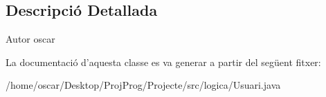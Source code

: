 \subsection{Descripció Detallada}
\begin{DoxyAuthor}{Autor}
oscar 
\end{DoxyAuthor}


La documentació d'aquesta classe es va generar a partir del següent fitxer\+:\begin{DoxyCompactItemize}
\item 
/home/oscar/\+Desktop/\+Proj\+Prog/\+Projecte/src/logica/Usuari.\+java\end{DoxyCompactItemize}
